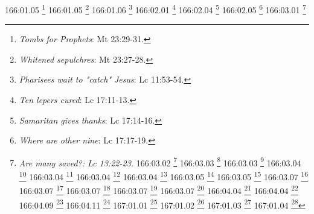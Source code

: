 {{{{{{{{{{{{{{{{{{{{{{{{{{{{{{{{{{{{{{{{{{{{{{166:01.05 \footnote{\textit{Tombs for Prophets}: Mt 23:29-31.}
166:01.05 \footnote{\textit{Whitened sepulchres}: Mt 23:27-28.}
166:01.06 \footnote{\textit{Pharisees wait to "catch" Jesus}: Lc 11:53-54.}
166:02.01 \footnote{\textit{Ten lepers cured}: Lc 17:11-13.}
166:02.04 \footnote{\textit{Samaritan gives thanks}: Lc 17:14-16.}
166:02.05 \footnote{\textit{Where are other nine}: Lc 17:17-19.}
166:03.01 \footnote{\textit{Are many saved?: Lc 13:22-23.}
166:03.02 \footnote{\textit{Caleb and Joshua}: Nm 26:65.}
166:03.03 \footnote{\textit{All may enter gate}: Lc 13:24.}
166:03.03 \footnote{\textit{Broad & narrow ways}: Dt 30:15-19; Mt 7:13-14.}
166:03.04 \footnote{\textit{Fight the good fight of faith}: 1 Ti 6:12; 2 Ti 4:7.}
166:03.04 \footnote{\textit{No entry to fold}: Mt 7:21-23; Mt 25:11-13.}
166:03.04 \footnote{\textit{Stand at door and knock}: Ap 3:20.}
166:03.04 \footnote{\textit{Those who spurn kingdom}: Lc 13:25-27.}
166:03.05 \footnote{\textit{First is last, last is first}: Mt 19:30; Mt 20:16; Mc 9:35; Mc 10:31; Lc 13:30.}
166:03.05 \footnote{\textit{Losers see others eat together}: Mt 8:11-12; Lc 13:28-30.}
166:03.07 \footnote{\textit{I am the door}: Jn 10:7,9.}
166:03.07 \footnote{\textit{I am the new and living way}: Jn 14:6.}
166:03.07 \footnote{\textit{Jesus knocks}: Ap 3:20-21.}
166:03.07 \footnote{\textit{Must be born again of the spirit}: Jn 3:3-7; 1 P 1:23.}
166:03.07 \footnote{\textit{Whosoever will may come}: Sal 50:15; Jl 2:32; Zac 13:9; Mt 7:24; Mt 10:32-33; Mt 12:50; Mt 16:24-25; Mc 3:35; Mc 8:34-35; Lc 6:47; Lc 9:23-24; Lc 12:8; Jn 3:15-16; Jn 4:13-14; Jn 11:25-26; Jn 12:46; Hch 2:21; Hch 10:43; Hch 13:26; Ro 9:33; Ro 10:13; 1 Jn 2:23; 1 Jn 4:15; 1 Jn 5:1; Ap 22:17b.}
166:04.04 \footnote{\textit{Innoent victims of time}: Lc 13:1-5.}
166:04.04 \footnote{\textit{Sun shines on everyone}: Mt 5:45b.}
166:04.09 \footnote{\textit{Barren fig tree}: Lc 13:6-9.}
166:04.11 \footnote{\textit{God is no respecter of persons}: 2 Cr 19:7; Job 34:19; Eclo 35:12; Hch 10:34; Ro 2:11; Gl 2:6; Gl 3:28; Ef 6:9; Col 3:11.}
167:01.01 \footnote{\textit{Breakfast with Pharisee}: Lc 14:1a.}
167:01.02 \footnote{\textit{Seat of honor}: Lc 14:7a.}
167:01.03 \footnote{\textit{Pharisees watched}: Lc 14:1b.}
167:01.04 \footnote{\textit{Jesus asks question, no answer.: Lc 14:3-4a.}
167:01.04 \footnote{\textit{Man with dropsy}: Lc 14:2.}
167:01.05 \footnote{\textit{Exalted-humbled-exalted}: Mt 18:1-4; Mt 23:12; Lc 1:52; Lc 14:11; Lc 18:14.}
167:01.05 \footnote{\textit{Jesus heals man of dropsy}: Lc 14:4b.}
167:01.05 \footnote{\textit{Talks to Pharisees}: Lc 14:5-14.}
}}}}}}}}}}}}}}}}}}}}}}}}}}}}}}}}}}}}}}}}}}}}}}}}
